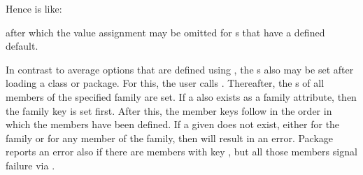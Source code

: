 \begin{Declaration}
\end{Declaration}
%
Hence  is like:
after which the value assignment may be omitted for s that have a
defined default.

In contrast to average options that are defined using ,
the s also may be set after loading a class or package. For this,
the user calls . Thereafter, the s of all
members of the specified family are set. If a  also exists as a
family attribute, then the family key is set first. After this, the member
keys follow in the order in which the members have been defined. If a given
 does not exist, either for the family or for any member of the
family, then  will result in an error. Package
 reports an error also if there are members with key
, but all those members signal failure via .
